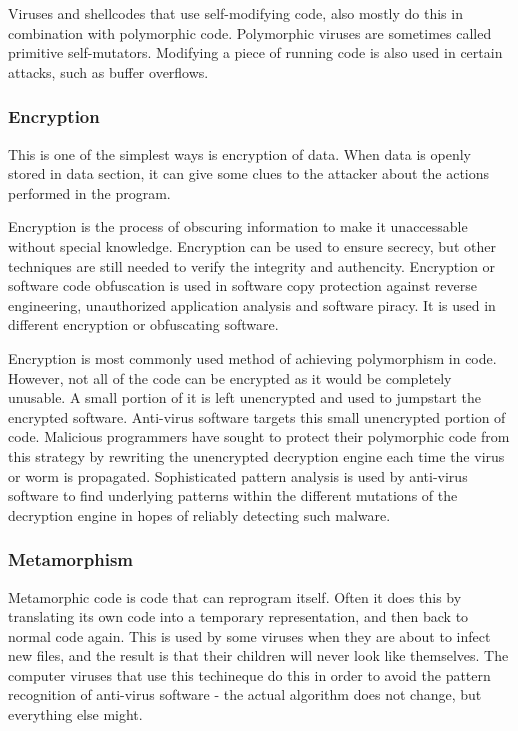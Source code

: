 \documentclass[a4paper,12pt]{article}
\begin{document}
    Viruses and shellcodes that use self-modifying code, also mostly do this
    in combination with polymorphic code. Polymorphic viruses are sometimes
    called primitive self-mutators. Modifying a piece of running code is
    also used in certain attacks, such as buffer overflows.

\subsubsection{Encryption}
    This is one of the simplest ways is encryption of data. When data is openly
    stored in data section, it can give some clues to the attacker about the
    actions performed in the program.

    Encryption is the process of obscuring information to make it unaccessable
    without special knowledge. Encryption can be used to ensure secrecy, but
    other techniques are still needed to verify the integrity and authencity.
    Encryption or software code obfuscation is used in software copy protection
    against reverse engineering, unauthorized application analysis and software
    piracy. It is used in different encryption or obfuscating software.

    Encryption is most commonly used method of achieving polymorphism in code.
    However, not all of the code can be encrypted as it would be completely
    unusable. A small portion of it is left unencrypted and used to jumpstart
    the encrypted software. Anti-virus software targets this small
    unencrypted portion of code. Malicious programmers have sought to protect
    their polymorphic code from this strategy by rewriting the unencrypted
    decryption engine each time the virus or worm is propagated. Sophisticated
    pattern analysis is used by anti-virus software to find underlying
    patterns within the different mutations of the decryption engine in hopes
    of reliably detecting such malware.

\subsubsection{Metamorphism}
    Metamorphic code is code that can reprogram itself. Often it does this by
    translating its own code into a temporary representation, and then back
    to normal code again. This is used by some viruses when they are about to
    infect new files, and the result is that their children will never look
    like themselves. The computer viruses that use this techineque do this in
    order to avoid the pattern recognition of anti-virus software - the actual
    algorithm does not change, but everything else might.
\end{document}
